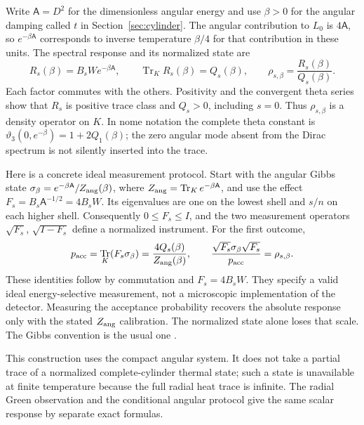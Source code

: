 \documentclass[11pt,letterpaper]{article}
\numberwithin{equation}{section}
\theoremstyle{remark}
\DeclareMathOperator{\Tr}{Tr}
\begin{document}
Write \(\mathsf A=D^2\) for the dimensionless angular energy and use
\(\beta>0\) for the angular damping called \(t\) in
Section~\ref{sec:cylinder}. The angular contribution to \(L_0\) is
\(4\mathsf A\), so \(e^{-\beta\mathsf A}\) corresponds to inverse
temperature \(\beta/4\) for that contribution in these units.
The spectral response and its normalized state are
\begin{equation}
 R_s(\beta)=B_sWe^{-\beta\mathsf A},\qquad
 \Tr_K R_s(\beta)=Q_s(\beta),\qquad
 \rho_{s,\beta}=\frac{R_s(\beta)}{Q_s(\beta)}.
 \label{eq:angular-state}
\end{equation}
Each factor commutes with the others. Positivity and the convergent
theta series show that \(R_s\) is positive trace class and
\(Q_s>0\), including \(s=0\). Thus \(\rho_{s,\beta}\) is a density
operator on \(K\). In nome notation the complete theta constant is
\(\vartheta_3(0,e^{-\beta})=1+2Q_1(\beta)\); the zero angular mode
absent from the Dirac spectrum is not silently inserted into the trace.

Here is a concrete ideal measurement protocol. Start with the angular
Gibbs state \(\sigma_\beta=e^{-\beta\mathsf A}/Z_{\rm ang}(\beta)\),
where \(Z_{\rm ang}=\Tr_K e^{-\beta\mathsf A}\), and use the effect
\(F_s=B_s\mathsf A^{-1/2}=4B_sW\). Its eigenvalues are one on the
lowest shell and \(s/n\) on each higher shell. Consequently
\(0\le F_s\le I\), and the two measurement operators
\(\sqrt{F_s}\), \(\sqrt{I-F_s}\) define a normalized instrument.
For the first outcome,
\begin{equation}
 p_{\rm acc}=\Tr_K(F_s\sigma_\beta)
       =\frac{4Q_s(\beta)}{Z_{\rm ang}(\beta)},\qquad
 \frac{\sqrt{F_s}\sigma_\beta\sqrt{F_s}}{p_{\rm acc}}
       =\rho_{s,\beta}.
 \label{eq:accepted-angular-state}
\end{equation}
These identities follow by commutation and \(F_s=4B_sW\).
They specify a valid ideal energy-selective measurement, not a
microscopic implementation of the detector. Measuring the acceptance
probability recovers the absolute response only with the stated
\(Z_{\rm ang}\) calibration. The normalized state alone loses that scale.
The Gibbs convention is the usual one \cite[Sections 1.3.1--1.3.2]{Tong}.

This construction uses the compact angular system. It does not take a
partial trace of a normalized complete-cylinder thermal state; such a
state is unavailable at finite temperature because the full radial
heat trace is infinite. The radial Green observation and the conditional
angular protocol give the same scalar response by separate exact formulas.
\end{document}
